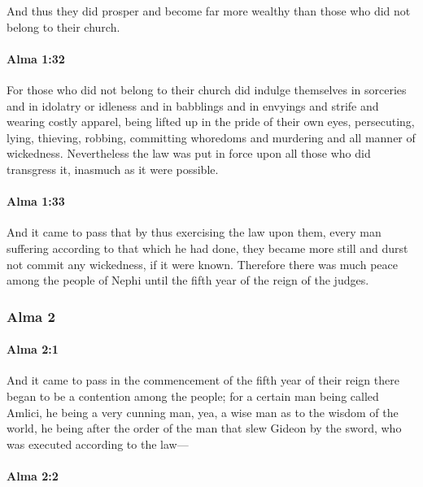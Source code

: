 			And thus they did prosper and become far more wealthy
			than those who did not belong to their church.

		\paragraph{Alma 1:32} %
			\label{ALMA-1-32}

			For those who did not belong to their church
			did indulge themselves in sorceries and in idolatry or idleness
			and in babblings and in envyings and strife and wearing costly apparel,
			being lifted up in the pride of their own eyes,
			persecuting, lying, thieving, robbing,
			committing whoredoms and murdering and all manner of wickedness.
			Nevertheless the law was put in force upon all those who did transgress it,
			inasmuch as it were possible.

		\paragraph{Alma 1:33} %
			\label{ALMA-1-33}

			And it came to pass that by thus exercising the law upon them,
			every man suffering according to that which he had done,
			they became more still
			and durst not commit any wickedness, if it were known.
			Therefore there was much peace among the people of Nephi
			until the fifth year of the reign of the judges.

	\subsubsection{Alma 2} %
		\label{ALMA-2}
		
		\paragraph{Alma 2:1} %
			\label{ALMA-2-1}

			And it came to pass in the commencement of the fifth year of their reign
			there began to be a contention among the people;
			for a certain man being called Amlici,
			he being a very cunning man,
			yea, a wise man as to the wisdom of the world,
			he being after the order of the man that slew Gideon by the sword,
			who was executed according to the law---

		\paragraph{Alma 2:2} %
			\label{ALMA-2-2}

